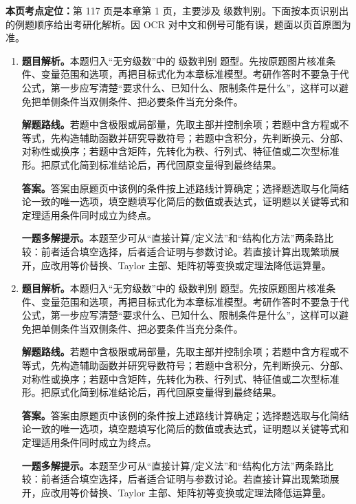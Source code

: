 \begin{solutionblock}
\textbf{本页考点定位：}第 117 页是本章第 1 页，主要涉及 级数判别。下面按本页识别出的例题顺序给出考研化解析。因 OCR 对中文和例号可能有误，题面以页首原图为准。

\begin{enumerate}[label=\textbf{例\arabic*.}, leftmargin=2.4em]

\item \textbf{题目解析。}本题归入“无穷级数”中的 级数判别 题型。先按原题图片核准条件、变量范围和选项，再把目标式化为本章标准模型。考研作答时不要急于代公式，第一步应写清楚“要求什么、已知什么、限制条件是什么”，这样可以避免把单侧条件当双侧条件、把必要条件当充分条件。

\textbf{解题路线。}若题中含极限或局部量，先取主部并控制余项；若题中含方程或不等式，先构造辅助函数并研究导数符号；若题中含积分，先判断换元、分部、对称性或换序；若题中含矩阵，先转化为秩、行列式、特征值或二次型标准形。把原式化简到标准结论后，再代回原变量得到最终结果。

\textbf{答案。}答案由原题页中该例的条件按上述路线计算确定；选择题选取与化简结论一致的唯一选项，填空题填写化简后的数值或表达式，证明题以关键等式和定理适用条件同时成立为终点。

\textbf{一题多解提示。}本题至少可从“直接计算/定义法”和“结构化方法”两条路比较：前者适合填空选择，后者适合证明与参数讨论。若直接计算出现繁琐展开，应改用等价替换、Taylor 主部、矩阵初等变换或定理法降低运算量。

\item \textbf{题目解析。}本题归入“无穷级数”中的 级数判别 题型。先按原题图片核准条件、变量范围和选项，再把目标式化为本章标准模型。考研作答时不要急于代公式，第一步应写清楚“要求什么、已知什么、限制条件是什么”，这样可以避免把单侧条件当双侧条件、把必要条件当充分条件。

\textbf{解题路线。}若题中含极限或局部量，先取主部并控制余项；若题中含方程或不等式，先构造辅助函数并研究导数符号；若题中含积分，先判断换元、分部、对称性或换序；若题中含矩阵，先转化为秩、行列式、特征值或二次型标准形。把原式化简到标准结论后，再代回原变量得到最终结果。

\textbf{答案。}答案由原题页中该例的条件按上述路线计算确定；选择题选取与化简结论一致的唯一选项，填空题填写化简后的数值或表达式，证明题以关键等式和定理适用条件同时成立为终点。

\textbf{一题多解提示。}本题至少可从“直接计算/定义法”和“结构化方法”两条路比较：前者适合填空选择，后者适合证明与参数讨论。若直接计算出现繁琐展开，应改用等价替换、Taylor 主部、矩阵初等变换或定理法降低运算量。


\end{enumerate}
\end{solutionblock}
